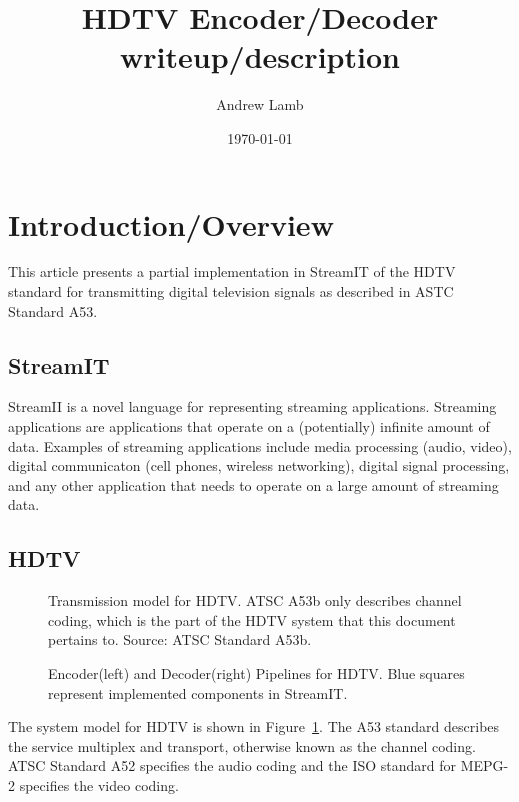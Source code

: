 \documentclass{article}
\title{HDTV Encoder/Decoder writeup/description}
\author{Andrew Lamb}
\date{\today}
\begin{document}
\maketitle
\newpage

\section{Introduction/Overview}

This article presents a partial implementation in StreamIT of the HDTV standard 
for transmitting digital television signals as described in 
ASTC Standard A53\cite{atsc:a53b}. 

\subsection{StreamIT}
StreamII is a novel language for representing streaming applications. Streaming applications 
are applications that operate on a (potentially) infinite amount of data. Examples of 
streaming applications include media processing (audio, video), digital communicaton
(cell phones, wireless networking), digital signal processing, and any other 
application that needs to operate on a large amount of streaming data.

\subsection{HDTV}
\begin{figure}
\center
\epsfxsize=4.5in
\caption{Transmission model for HDTV. ATSC A53b only describes channel coding, which is the part of the HDTV system that this document pertains to. Source: ATSC Standard A53b\cite{atsc:a53b}.}
\label{fig:hdtv-system}
\end{figure}

\begin{figure}
\center
\epsfxsize=4.0in
\epsfxsize=4.0in

\caption{Encoder(left) and Decoder(right) Pipelines for HDTV. Blue squares represent implemented components in StreamIT.}
\label{fig:hdtv-pipeline}
\end{figure}

The system model for HDTV is 
shown in Figure~\ref{fig:hdtv-system}. The A53 standard describes
the service multiplex and transport, otherwise known as the channel coding.
ATSC Standard A52\cite{atsc:a52a} specifies the audio coding and the ISO  
standard for MEPG-2\cite{iso:13818-1}\cite{iso:13818-2} specifies the video coding.
\end{document}
